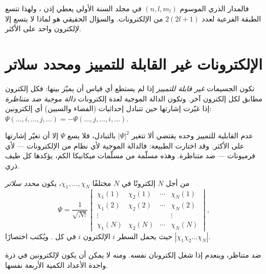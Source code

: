 فالمدار الذري الموسوم $(n, l, m_l)$ في مجلد السنة الأولى يعطي إذن ، ولهذا تتسع الطبقة الفرعية لعدد $2(2l+1)$ من الإلكترونات. والسؤال
الحقيقي هو لماذا لا يتسع  إلا لإلكترون واحد على الأكثر.

\section{الإلكترونات غير القابلة للتمييز ومحدد سلاتر}

\begin{definition}\label{def:b3:many-electron-atoms:indistinguishable}
تكون الجسيمات \emph{غير قابلة للتمييز} إذا
لم يستطع أي قياس أن يميّز بينها: فكل إلكترون مطابق لكل إلكترون
آخر. وتكون الدالة الموجية لعدة إلكترونات \emph{دالة موجية ضد
متناظرة} إذا غيّرت إشارتها حين تتبادل
إحداثيات (الفضاء والسبين) أي إلكترونين:
$\Psi(\dots,i,\dots,j,\dots) = -\Psi(\dots,j,\dots,i,\dots)$.
\end{definition}

عدم القابلية للتمييز وحده يقتضي ألا تتغير $|\Psi|^2$ بالتبادل،
فلا يسع $\Psi$ إلا أن تغيّر إشارتها على الأكثر. وقد اختارت الطبيعة:
فالدالة الموجية لأي نظام من الإلكترونات --- لأي فرميونات --- ضد
متناظرة. وهذه مسلّمة من مسلّمات ميكانيكا الكم، يؤكدها كل طيف
ذري.

\begin{definition}\label{def:b3:many-electron-atoms:slater}
من أجل $N$ إلكترونًا في $N$  مختلفًا $\chi_1, \dots, \chi_N$، يكون
\emph{محدد سلاتر}
\[
\Psi = \frac{1}{\sqrt{N!}}\begin{vmatrix}
\chi_1(1) & \chi_2(1) & \cdots & \chi_N(1)\\
\chi_1(2) & \chi_2(2) & \cdots & \chi_N(2)\\
\vdots & & & \vdots\\
\chi_1(N) & \chi_2(N) & \cdots & \chi_N(N)
\end{vmatrix},
\]
حيث يحمل السطر $i$ الإلكترون $i$ في كل . ويُكتب اختصارًا
$|\chi_1\chi_2\dots\chi_N|$.
\end{definition}

\begin{theorem}\label{thm:b3:many-electron-atoms:pauli}
 ضد متناظر، وينعدم إذا شغل إلكترونان
 نفسه. ومنه لا يمكن أن يكون لإلكترونين في ذرة واحدة
الأعداد الكمية الأربعة نفسها.
\end{theorem}

